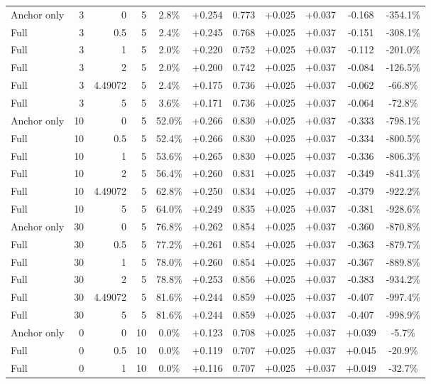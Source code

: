 \begin{table}[htbp]
\begin{tabular}{lrrrccccccc}
Anchor only & 3 & 0 & 5 & 2.8\% & +0.254 & 0.773 & +0.025 & +0.037 & -0.168 & -354.1\% \\
Full & 3 & 0.5 & 5 & 2.4\% & +0.245 & 0.768 & +0.025 & +0.037 & -0.151 & -308.1\% \\
Full & 3 & 1 & 5 & 2.0\% & +0.220 & 0.752 & +0.025 & +0.037 & -0.112 & -201.0\% \\
Full & 3 & 2 & 5 & 2.0\% & +0.200 & 0.742 & +0.025 & +0.037 & -0.084 & -126.5\% \\
Full & 3 & 4.49072 & 5 & 2.4\% & +0.175 & 0.736 & +0.025 & +0.037 & -0.062 & -66.8\% \\
Full & 3 & 5 & 5 & 3.6\% & +0.171 & 0.736 & +0.025 & +0.037 & -0.064 & -72.8\% \\
Anchor only & 10 & 0 & 5 & 52.0\% & +0.266 & 0.830 & +0.025 & +0.037 & -0.333 & -798.1\% \\
Full & 10 & 0.5 & 5 & 52.4\% & +0.266 & 0.830 & +0.025 & +0.037 & -0.334 & -800.5\% \\
Full & 10 & 1 & 5 & 53.6\% & +0.265 & 0.830 & +0.025 & +0.037 & -0.336 & -806.3\% \\
Full & 10 & 2 & 5 & 56.4\% & +0.260 & 0.831 & +0.025 & +0.037 & -0.349 & -841.3\% \\
Full & 10 & 4.49072 & 5 & 62.8\% & +0.250 & 0.834 & +0.025 & +0.037 & -0.379 & -922.2\% \\
Full & 10 & 5 & 5 & 64.0\% & +0.249 & 0.835 & +0.025 & +0.037 & -0.381 & -928.6\% \\
Anchor only & 30 & 0 & 5 & 76.8\% & +0.262 & 0.854 & +0.025 & +0.037 & -0.360 & -870.8\% \\
Full & 30 & 0.5 & 5 & 77.2\% & +0.261 & 0.854 & +0.025 & +0.037 & -0.363 & -879.7\% \\
Full & 30 & 1 & 5 & 78.0\% & +0.260 & 0.854 & +0.025 & +0.037 & -0.367 & -889.8\% \\
Full & 30 & 2 & 5 & 78.8\% & +0.253 & 0.856 & +0.025 & +0.037 & -0.383 & -934.2\% \\
Full & 30 & 4.49072 & 5 & 81.6\% & +0.244 & 0.859 & +0.025 & +0.037 & -0.407 & -997.4\% \\
Full & 30 & 5 & 5 & 81.6\% & +0.244 & 0.859 & +0.025 & +0.037 & -0.407 & -998.9\% \\
Anchor only & 0 & 0 & 10 & 0.0\% & +0.123 & 0.708 & +0.025 & +0.037 & +0.039 & -5.7\% \\
Full & 0 & 0.5 & 10 & 0.0\% & +0.119 & 0.707 & +0.025 & +0.037 & +0.045 & -20.9\% \\
Full & 0 & 1 & 10 & 0.0\% & +0.116 & 0.707 & +0.025 & +0.037 & +0.049 & -32.7\% \\

\end{tabular}
\end{table}
